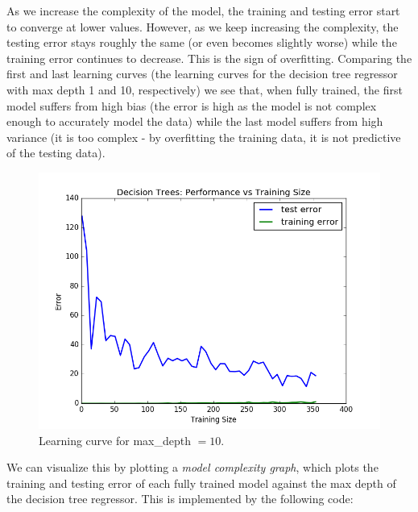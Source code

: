 \documentclass[12 pt]{article}
\numberwithin{equation}{section}
\begin{document}
\newpage

As we increase the complexity of the model, the training and testing error start to converge at lower values. However, as we keep increasing the complexity, the testing error stays roughly the same (or even becomes slightly worse) while the training error continues to decrease. This is the sign of overfitting. Comparing the first and last learning curves (the learning curves for the decision tree regressor with max depth 1 and 10, respectively) we see that, when fully trained, the first model suffers from high bias (the error is high as the model is not complex enough to accurately model the data) while the last model suffers from high variance (it is too complex - by overfitting the training data, it is not predictive of the testing data). 

\begin{figure}[h]
\begin{center}
		\includegraphics[scale=0.4]{figure_10}
		\caption{Learning curve for max\_depth $= 10$.}
\end{center}
\end{figure}

\newpage

We can visualize this by plotting a \emph{model complexity graph}, which plots the training and testing error of each fully trained model against the max depth of the decision tree regressor. This is implemented by the following code:
\end{document}
